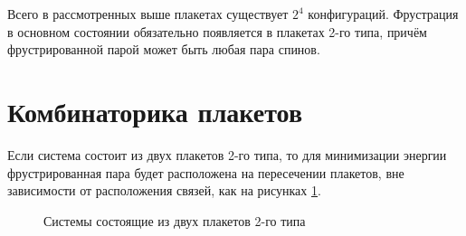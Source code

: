 \documentclass[utf8, babel, sor, jor, amsmath, amssymb, reprint]{elsarticle} %
\begin{document}
Всего в рассмотренных выше плакетах существует $2^4$ конфигураций.
Фрустрация в основном состоянии обязательно появляется в плакетах 2-го типа, причём фрустрированной парой может быть любая пара спинов.

\section{Комбинаторика плакетов}

Если система состоит из двух плакетов 2-го типа, то для минимизации энергии фрустрированная пара будет расположена на пересечении плакетов, вне зависимости от расположения связей, как на рисунках \ref{fig:Type2_32}. 

\begin{figure}[H]
	\centering
	\begin{minipage}{0.3\textwidth}
		\centering
		\label{fig:Type2_3x2}
	\end{minipage}
	\hspace{20pt} 
	\begin{minipage}{0.3\textwidth}
		\centering
		\label{fig:Type2_3x2_2}
	\end{minipage}
	\caption{Системы состоящие из двух плакетов 2-го типа}
	\label{fig:Type2_32}
\end{figure}
\end{document}
